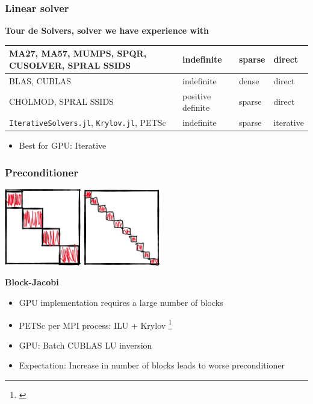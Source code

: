 \begin{frame}
  \frametitle{Linear solver}
  {\bf Tour de Solvers, solver we have experience with}
  \begin{table}
  \begin{tabular}{p{5cm}|lll}
    MA27, MA57, MUMPS, SPQR, CUSOLVER, SPRAL SSIDS & indefinite & sparse & direct \\
    \hline
    BLAS, CUBLAS & indefinite & dense  & direct \\
    \hline
    CHOLMOD, SPRAL SSIDS& positive definite & sparse & direct \\
    \hline
    \lstinline{IterativeSolvers.jl}, \lstinline{Krylov.jl}, PETSc & indefinite & sparse & iterative \\ 
  \end{tabular}
\end{table}
  \begin{itemize}
    \item Best for GPU: Iterative
  \end{itemize}
\end{frame}

\begin{frame}
  \frametitle{Preconditioner}
  \begin{center}
    \includegraphics[width=0.25\textwidth]{figures/mpiblocks}
    \includegraphics[width=0.25\textwidth]{figures/gpublocks}
  \end{center}
  {\bf Block-Jacobi}
  \begin{itemize}
    \item GPU implementation requires a large number of blocks
    \item PETSc per MPI process: ILU + Krylov \footnote{\cite{schwarz}} 
    \item GPU: Batch CUBLAS LU inversion
    \item Expectation: Increase in number of blocks leads to worse preconditioner
  \end{itemize}
\end{frame}

